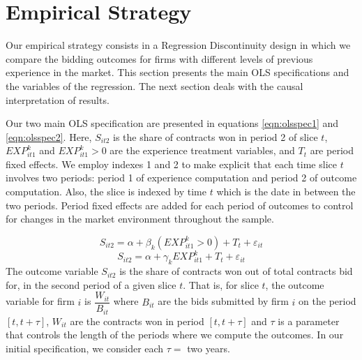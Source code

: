 

\section{Empirical Strategy}
\label{section:main_empirical}
Our empirical strategy consists in a Regression Discontinuity design in which we compare the bidding outcomes for firms with different levels of previous experience in the market. This section presents the main OLS specifications and the variables of the regression. The next section deals with the causal interpretation of results.

Our two main OLS specification are presented in equations \ref{eqn:olsspec1} and \ref{eqn:olsspec2}. Here, $S_{it2}$ is the share of contracts won in period 2 of slice $t$, $EXP^k_{it1}$ and $EXP^k_{it1}>0$ are the experience treatment variables, and $T_t$ are period fixed effects. We employ indexes 1 and 2 to make explicit that each time slice $t$ involves two periods: period 1 of experience computation and period 2 of outcome computation. Also, the slice is indexed by time $t$ which is the date in between the two periods. Period fixed effects are added for each period of outcomes to control for changes in the market environment throughout the sample.

\begin{equation}
  \label{eqn:olsspec1}
S_{it2}=\alpha+ \beta_{k} (EXP^k_{it1}>0)+T_t+\varepsilon_{it}
\end{equation}
\begin{equation}
\label{eqn:olsspec2}
S_{it2}=\alpha+ \gamma_{k} EXP^k_{it1}+T_t+\varepsilon_{it}
\end{equation}
The outcome variable $S_{it2}$ is the share of contracts won out of total contracts bid for, in the second period of a given slice $t$. That is, for slice $t$, the outcome variable for firm $i$ is $\dfrac{W_{it}}{B_{it}}$ where $B_{it}$ are the bids submitted by firm $i$ on the period $[t,t+\tau]$, $W_{it}$ are the contracts won in period $[t,t+\tau]$ and $\tau$ is a parameter that controls the length of the periods where we compute the outcomes. In our initial specification, we consider each $\tau=$ two years. %

